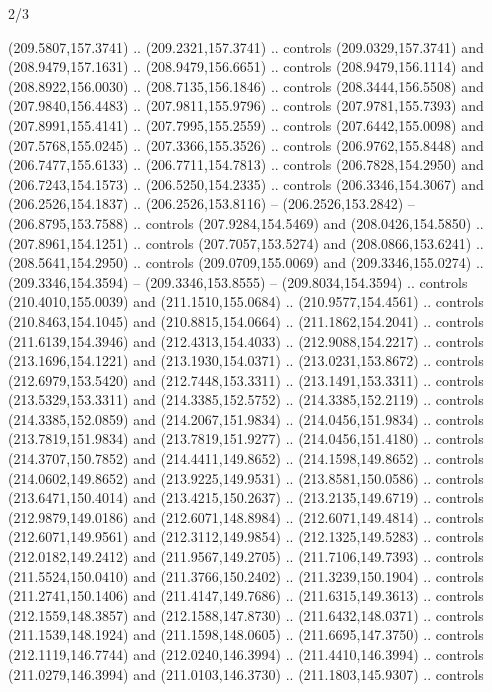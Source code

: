 \begin{flagdescription}{2/3}
\begin{scope}[xshift=0.5\flaglength,yshift=0.5\flagwidth,scale=\flagwidth/180]
\begin{scope}[y=0.8pt, x=0.8pt, yscale=-1,shift={(-168.75,-108.75)}]
  (209.5807,157.3741) .. (209.2321,157.3741) .. controls (209.0329,157.3741) and
  (208.9479,157.1631) .. (208.9479,156.6651) .. controls (208.9479,156.1114) and
  (208.8922,156.0030) .. (208.7135,156.1846) .. controls (208.3444,156.5508) and
  (207.9840,156.4483) .. (207.9811,155.9796) .. controls (207.9781,155.7393) and
  (207.8991,155.4141) .. (207.7995,155.2559) .. controls (207.6442,155.0098) and
  (207.5768,155.0245) .. (207.3366,155.3526) .. controls (206.9762,155.8448) and
  (206.7477,155.6133) .. (206.7711,154.7813) .. controls (206.7828,154.2950) and
  (206.7243,154.1573) .. (206.5250,154.2335) .. controls (206.3346,154.3067) and
  (206.2526,154.1837) .. (206.2526,153.8116) -- (206.2526,153.2842) --
  (206.8795,153.7588) .. controls (207.9284,154.5469) and (208.0426,154.5850) ..
  (207.8961,154.1251) .. controls (207.7057,153.5274) and (208.0866,153.6241) ..
  (208.5641,154.2950) .. controls (209.0709,155.0069) and (209.3346,155.0274) ..
  (209.3346,154.3594) -- (209.3346,153.8555) -- (209.8034,154.3594) .. controls
  (210.4010,155.0039) and (211.1510,155.0684) .. (210.9577,154.4561) .. controls
  (210.8463,154.1045) and (210.8815,154.0664) .. (211.1862,154.2041) .. controls
  (211.6139,154.3946) and (212.4313,154.4033) .. (212.9088,154.2217) .. controls
  (213.1696,154.1221) and (213.1930,154.0371) .. (213.0231,153.8672) .. controls
  (212.6979,153.5420) and (212.7448,153.3311) .. (213.1491,153.3311) .. controls
  (213.5329,153.3311) and (214.3385,152.5752) .. (214.3385,152.2119) .. controls
  (214.3385,152.0859) and (214.2067,151.9834) .. (214.0456,151.9834) .. controls
  (213.7819,151.9834) and (213.7819,151.9277) .. (214.0456,151.4180) .. controls
  (214.3707,150.7852) and (214.4411,149.8652) .. (214.1598,149.8652) .. controls
  (214.0602,149.8652) and (213.9225,149.9531) .. (213.8581,150.0586) .. controls
  (213.6471,150.4014) and (213.4215,150.2637) .. (213.2135,149.6719) .. controls
  (212.9879,149.0186) and (212.6071,148.8984) .. (212.6071,149.4814) .. controls
  (212.6071,149.9561) and (212.3112,149.9854) .. (212.1325,149.5283) .. controls
  (212.0182,149.2412) and (211.9567,149.2705) .. (211.7106,149.7393) .. controls
  (211.5524,150.0410) and (211.3766,150.2402) .. (211.3239,150.1904) .. controls
  (211.2741,150.1406) and (211.4147,149.7686) .. (211.6315,149.3613) .. controls
  (212.1559,148.3857) and (212.1588,147.8730) .. (211.6432,148.0371) .. controls
  (211.1539,148.1924) and (211.1598,148.0605) .. (211.6695,147.3750) .. controls
  (212.1119,146.7744) and (212.0240,146.3994) .. (211.4410,146.3994) .. controls
  (211.0279,146.3994) and (211.0103,146.3730) .. (211.1803,145.9307) .. controls

\end{scope}
\end{scope}
\end{flagdescription}
